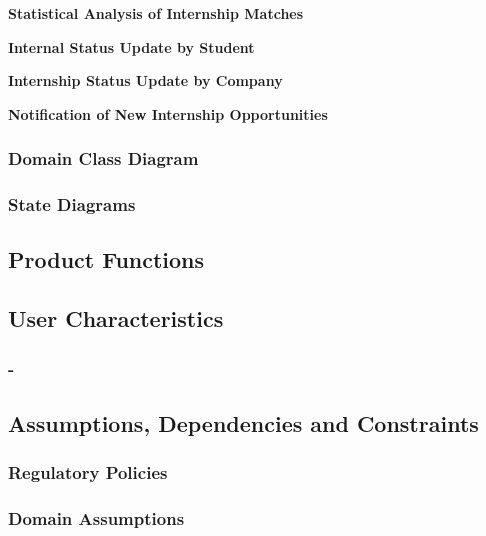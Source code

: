 \begin{enumerate}[label=\textbf{[\arabic*]}, left = 0 pt, align = left]
\item \textbf{Statistical Analysis of Internship Matches}            
\\


\item \textbf{Internal Status Update by Student}                     
\\


\item \textbf{Internship Status Update by Company}                   
\\


\item \textbf{Notification of New Internship Opportunities}          
\\

\end{enumerate}

\subsubsection{Domain Class Diagram}

\subsubsection{State Diagrams}

\subsection{Product Functions}

\subsection{User Characteristics}

\subsubsection{-}

\subsection{Assumptions, Dependencies and Constraints}

\subsubsection{Regulatory Policies}

\subsubsection{Domain Assumptions}
